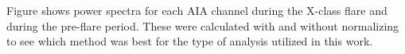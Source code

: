 Figure
shows power spectra for each AIA channel
during the X-class flare and during the pre-flare period.
These were calculated with and without normalizing to see which
method was best for the type of analysis utilized in this work.


